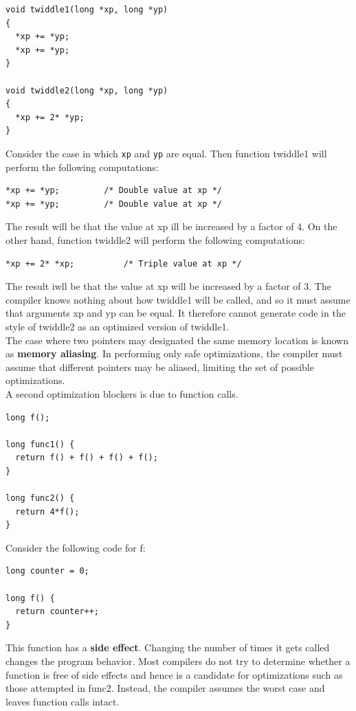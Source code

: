 \documentclass[11pt]{article}
\begin{document}
\begin{verbatim}
void twiddle1(long *xp, long *yp)
{
  *xp += *yp;
  *xp += *yp;
}

void twiddle2(long *xp, long *yp)
{
  *xp += 2* *yp;
}
\end{verbatim}

Consider the case in which \texttt{xp} and \texttt{yp} are equal. Then function twiddle1 will perform the following computations:\\
\begin{verbatim}
*xp += *yp;			/* Double value at xp */
*xp += *yp;			/* Double value at xp */
\end{verbatim}
The result will be that the value at xp ill be increased by a factor of 4. On the other hand, function twiddle2 will perform the following computations:\\
\begin{verbatim}
*xp += 2* *xp;			/* Triple value at xp */
\end{verbatim}
The result iwll be that the value at xp will be increased by a factor of 3. The compiler knows nothing about how twiddle1 will be called, and so it must assume that arguments xp and yp can be equal. It therefore cannot generate code in the style of twiddle2 as an optimized version of twiddle1.\\

The case where two pointers may designated the same memory location is known as \textbf{memory aliasing}. In performing only safe optimizations, the compiler must assume that different pointers may be aliased, limiting the set of possible optimizations.\\


A second optimization blockers is due to function calls.\\
\begin{verbatim}
long f();

long func1() {
  return f() + f() + f() + f();
}

long func2() {
  return 4*f();
}
\end{verbatim}

Consider the following code for f:\\
\begin{verbatim}
long counter = 0;

long f() {
  return counter++;
}
\end{verbatim}
This function has a \textbf{side effect}. Changing the number of times it gets called changes the program behavior. Most compilers do not try to determine whether a function is free of side effects and hence is a candidate for optimizations such as those attempted in func2. Instead, the compiler assumes the worst case and leaves function calls intact.\\
\end{document}
